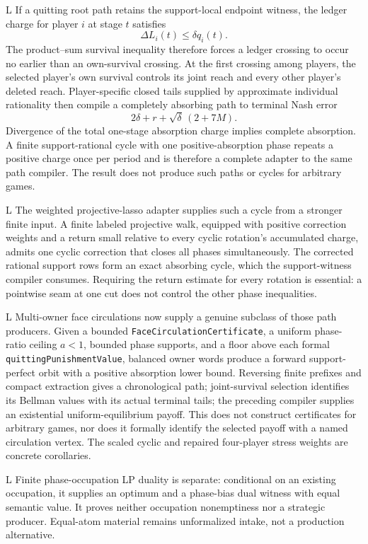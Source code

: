 \documentclass[11pt]{article}
\newcommand{\LTag}{\textsf{L}}
\newcommand{\Prod}{\LTag}
\newcommand{\Status}[1]{#1}
\begin{document}
\Status{\Prod} If a quitting root path retains the support-local endpoint
witness, the ledger charge for player \(i\) at stage \(t\) satisfies
\[
  \Delta L_i(t)\leq \delta q_i(t).
\]
The product--sum survival inequality therefore forces a ledger crossing to
occur no earlier than an own-survival crossing.  At the first crossing among
players, the selected player's own survival controls its joint reach and every
other player's deleted reach.  Player-specific closed tails supplied by
approximate individual rationality then compile a completely absorbing path
to terminal Nash error
\[
  2\delta+r+\sqrt{\delta}\,(2+7M).
\]
Divergence of the total one-stage absorption charge implies complete
absorption.  A finite support-rational cycle with one positive-absorption
phase repeats a positive charge once per period and is therefore a complete
adapter to the same path compiler.  The result does not produce such paths or
cycles for arbitrary games.

\Status{\Prod} The weighted projective-lasso adapter supplies such a cycle
from a stronger finite input.  A finite labeled projective walk, equipped with
positive correction weights and a return small relative to every cyclic
rotation's accumulated charge, admits one cyclic correction that closes all
phases simultaneously.  The corrected rational support rows form an exact
absorbing cycle, which the support-witness compiler consumes.  Requiring the
return estimate for every rotation is essential: a pointwise seam at one cut
does not control the other phase inequalities.

\Status{\Prod} Multi-owner face circulations now supply a genuine subclass of
those path producers.  Given a bounded \texttt{FaceCirculationCertificate}, a
uniform phase-ratio ceiling \(a<1\), bounded phase supports, and a floor above
each formal \texttt{quittingPunishmentValue}, balanced owner words produce a
forward support-perfect orbit with a positive absorption lower bound.
Reversing finite prefixes and compact extraction gives a chronological path;
joint-survival selection identifies its Bellman values with its actual terminal
tails; the preceding compiler supplies an existential uniform-equilibrium
payoff.  This does not construct certificates for arbitrary games, nor does it
formally identify the selected payoff with a named circulation vertex.  The
scaled cyclic and repaired four-player stress weights are concrete corollaries.

\Status{\Prod} Finite phase-occupation LP duality is separate: conditional on
an existing occupation, it supplies an optimum and a phase-bias dual witness
with equal semantic value.  It proves neither occupation nonemptiness nor a
strategic producer.  Equal-atom material remains unformalized intake, not a
production alternative.
\end{document}
